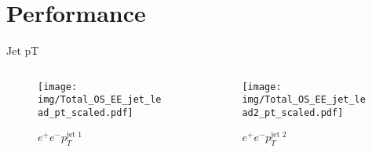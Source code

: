 \documentclass{beamer}
\begin{document}
%
%
%
%

\section{Performance}

\begin{frame}{Jet pT}
  \begin{columns}
    \begin{column}{0.45\textwidth}\begin{figure}
      \caption{$e^{+}e^{-}$$p_{T}^{\text{jet 1}}$}
      \texttt{[image: img/Total\_OS\_EE\_jet\_lead\_pt\_scaled.pdf]}
    \end{figure}\end{column}
    \begin{column}{0.45\textwidth}\begin{figure}
      \caption{$e^{+}e^{-}$$p_{T}^{\text{jet 2}}$}
      \texttt{[image: img/Total\_OS\_EE\_jet\_lead2\_pt\_scaled.pdf]}
    \end{figure}\end{column}
  \end{columns}
\end{frame}
\end{document}
